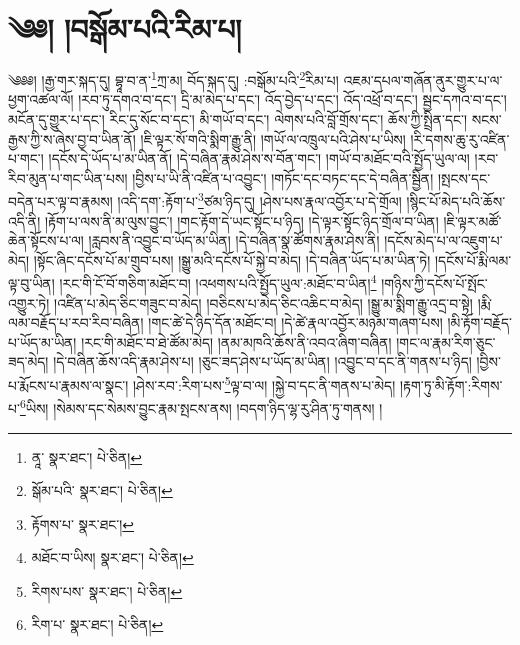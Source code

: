 \setcounter{footnote}{0} 
\chapter{༄༅། །བསྒོམ་པའི་རིམ་པ།}༄༅༅། །རྒྱ་གར་སྐད་དུ། བྷཱ་བ་ན་\footnote{ནཱ་  སྣར་ཐང་།  པེ་ཅིན། }ཀྲ་མ། བོད་སྐད་དུ། :བསྒོམ་པའི་\footnote{སྒོམ་པའི་  སྣར་ཐང་།  པེ་ཅིན། }རིམ་པ། འཇམ་དཔལ་གཞོན་ནུར་གྱུར་པ་ལ་ཕྱག་འཚལ་ལོ། །རབ་ཏུ་དགའ་བ་དང་། དྲི་མ་མེད་པ་དང་། འོད་བྱེད་པ་དང་། འོད་འཕྲོ་བ་དང་། སྦྱང་དཀའ་བ་དང་། མངོན་དུ་གྱུར་པ་དང་། རིང་དུ་སོང་བ་དང་། མི་གཡོ་བ་དང་། ལེགས་པའི་བློ་གྲོས་དང་། ཆོས་ཀྱི་སྤྲིན་དང་། སངས་རྒྱས་ཀྱི་ས་ཞེས་བྱ་བ་ཡིན་ནོ། །ཇི་ལྟར་སོ་གའི་སྨིག་རྒྱུ་ནི། །གཡོ་ལ་འཁྲུལ་པའི་ཤེས་པ་ཡིས། །རི་དགས་ཆུ་རུ་འཛིན་པ་གང་། །དངོས་དེ་ཡོད་པ་མ་ཡིན་ནོ། །དེ་བཞིན་རྣམ་ཤེས་ས་བོན་གང་། །གཡོ་བ་མཐོང་བའི་སྤྱོད་ཡུལ་ལ། །རབ་རིབ་མུན་པ་གང་ཡིན་པས། །བྱིས་པ་ཡི་ནི་འཛིན་པ་འབྱུང་། །གཏོང་དང་བཏང་དང་དེ་བཞིན་སྦྱིན། །སྤངས་དང་བདེན་པར་ལྟ་བ་རྣམས། །འདི་དག་:རྟོག་པ་\footnote{རྟོགས་པ་  སྣར་ཐང་། }ཙམ་ཉིད་དུ། །ཤེས་པས་རྣལ་འབྱོར་པ་དེ་གྲོལ། །སྙིང་པོ་མེད་པའི་ཆོས་འདི་ནི། །རྟོག་པ་ལས་ནི་མ་ལུས་བྱུང་། །གང་རྟོག་དེ་ཡང་སྟོང་པ་ཉིད། །དེ་ལྟར་སྟོང་ཉིད་གྲོལ་བ་ཡིན། །ཇི་ལྟར་མཚོ་ཆེན་སྟོངས་པ་ལ། །རླབས་ནི་འབྱུང་བ་ཡོད་མ་ཡིན། །དེ་བཞིན་སྣ་ཚོགས་རྣམ་ཤེས་ནི། །དངོས་མེད་པ་ལ་འཇུག་པ་མེད། །སྟོང་ཞིང་དངོས་པོ་མ་གྲུབ་པས། །སྒྱུ་མའི་དངོས་པོ་སྐྱེ་བ་མེད། །དེ་བཞིན་ཡོད་པ་མ་ཡིན་ཏེ། །དངོས་པོ་རྨི་ལམ་ལྟ་བུ་ཡིན། །རང་གི་ངོ་བོ་གཅིག་མཐོང་བ། །འཕགས་པའི་སྤྱོད་ཡུལ་:མཐོང་བ་ཡིན།\footnote{མཐོང་བ་ཡིས།  སྣར་ཐང་།  པེ་ཅིན། } །གཉིས་ཀྱི་དངོས་པོ་སྤོང་འགྱུར་ཏེ། །འཛིན་པ་མེད་ཅིང་གཟུང་བ་མེད། །བཅིངས་པ་མེད་ཅིང་འཆིང་བ་མེད། །སྒྱུ་མ་སྨིག་རྒྱུ་འདྲ་བ་སྟེ། །རྨི་ལམ་བརྗོད་པ་རབ་རིབ་བཞིན། །གང་ཚེ་དེ་ཉིད་དོན་མཐོང་བ། །དེ་ཚེ་རྣལ་འབྱོར་མཉམ་གཞག་པས། །མི་རྟོག་བརྗོད་པ་ཡོད་མ་ཡིན། །རང་གི་མཐོང་བ་ཐེ་ཚོམ་མེད། །ནམ་མཁའི་ཆོས་ནི་འབའ་ཞིག་བཞིན། །གང་ལ་རྣམ་རིག་ཅུང་ཟད་མེད། །དེ་བཞིན་ཆོས་འདི་རྣམ་ཤེས་པ། །ཅུང་ཟད་ཤེས་པ་ཡོད་མ་ཡིན། །འབྱུང་བ་དང་ནི་གནས་པ་ཉིད། །བྱིས་པ་རྨོངས་པ་རྣམས་ལ་སྣང་། །ཤེས་རབ་:རིག་པས་\footnote{རིགས་པས་  སྣར་ཐང་།  པེ་ཅིན། }ལྟ་བ་ལ། །སྐྱེ་བ་དང་ནི་གནས་པ་མེད། །རྟག་ཏུ་མི་རྟོག་:རིགས་པ་\footnote{རིག་པ་  སྣར་ཐང་།  པེ་ཅིན། }ཡིས། །སེམས་དང་སེམས་བྱུང་རྣམ་སྤངས་ནས། །བདག་ཉིད་ལྷ་རུ་ཤིན་ཏུ་གནས། །
